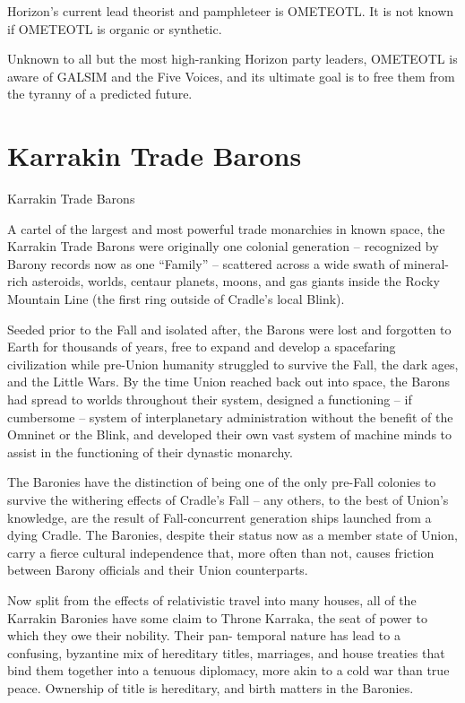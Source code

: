 Horizon’s current lead theorist and pamphleteer is OMETEOTL. It is not known if OMETEOTL is  
organic or synthetic. 
 

Unknown to all but the most high-ranking Horizon party leaders, OMETEOTL is aware of GALSIM  
and the Five Voices, and its ultimate goal is to free them from the tyranny of a predicted future. 
 

                                                                                                         
\section{Karrakin Trade Barons}

Karrakin Trade Barons  

A cartel of the largest and most powerful trade monarchies in known space, the Karrakin Trade  
Barons were originally one colonial generation -- recognized by Barony records now as one  
“Family” -- scattered across a wide swath of mineral-rich asteroids, worlds, centaur planets,  
moons, and gas giants inside the Rocky Mountain Line (the first ring outside of Cradle’s local  
Blink). 
 

Seeded prior to the Fall and isolated after, the Barons were lost and forgotten to Earth for  
thousands of years, free to expand and develop a spacefaring civilization while pre-Union  
humanity struggled to survive the Fall, the dark ages, and the Little Wars. By the time Union  
reached back out into space, the Barons had spread to worlds throughout their system,  
designed a functioning -- if cumbersome -- system of interplanetary administration without the  
benefit of the Omninet or the Blink, and developed their own vast system of machine minds to  
assist in the functioning of their dynastic monarchy. 
 

The Baronies have the distinction of being one of the only pre-Fall colonies to survive the  
withering effects of Cradle’s Fall -- any others, to the best of Union’s knowledge, are the result of  
Fall-concurrent generation ships launched from a dying Cradle. The Baronies, despite their  
status now as a member state of Union, carry a fierce cultural independence that, more often  
than not, causes friction between Barony officials and their Union counterparts. 
 

Now split from the effects of relativistic travel into many houses, all of the Karrakin Baronies have  
some claim to Throne Karraka, the seat of power to which they owe their nobility. Their pan- 
temporal nature has lead to a confusing, byzantine mix of hereditary titles, marriages, and house  
treaties that bind them together into a tenuous diplomacy, more akin to a cold war than true  
peace. Ownership of title is hereditary, and birth matters in the Baronies. 
 

